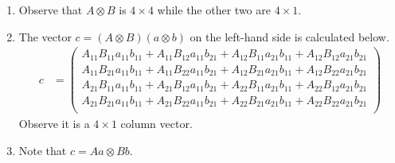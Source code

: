 \begin{answer}
\begin{enumerate}
\begin{align*}
\begin{pmatrix}
				      a_{21} b_{11} \\
				      a_{21} b_{21}
			      \end{pmatrix}
			      \\ Aa \otimes Bb & =
			      \begin{pmatrix}
				      \left( A_{11} a_{11} + A_{12} a_{21} \right)
				      \left( B_{11} b_{11} + B_{12} b_{21} \right) \\
				      \left( A_{11} a_{11} + A_{12} a_{21} \right)
				      \left( B_{21} b_{11} + B_{22} b_{21} \right) \\
				      \left( A_{21} a_{11} + A_{22} a_{21} \right)
				      \left( B_{11} b_{11} + B_{12} b_{21} \right) \\
				      \left( A_{21} a_{11} + A_{22} a_{21} \right)
				      \left( B_{21} b_{11} + B_{22} b_{21} \right)
			      \end{pmatrix}
			                  &
		      \end{align*}
		\item Observe that $A \otimes B$ is $4 \times 4$ while the other two are $4 \times 1$.
		\item
		      The vector $c = \left(A \otimes B\right) \left(a \otimes b\right)$ on the left-hand side is calculated below.
		      \begin{align*}
			      c & =
			      \begin{pmatrix}
				      A_{11} B_{11} a_{11} b_{11} + A_{11} B_{12} a_{11} b_{21} + A_{12} B_{11} a_{21} b_{11} + A_{12} B_{12} a_{21} b_{21} \\
				      A_{11} B_{21} a_{11} b_{11} + A_{11} B_{22} a_{11} b_{21} + A_{12} B_{21} a_{21} b_{11} + A_{12} B_{22} a_{21} b_{21} \\
				      A_{21} B_{11} a_{11} b_{11} + A_{21} B_{12} a_{11} b_{21} + A_{22} B_{11} a_{21} b_{11} + A_{22} B_{12} a_{21} b_{21} \\
				      A_{21} B_{21} a_{11} b_{11} + A_{21} B_{22} a_{11} b_{21} + A_{22} B_{21} a_{21} b_{11} + A_{22} B_{22} a_{21} b_{21} \\
			      \end{pmatrix}
		      \end{align*}
		      Observe it is a $4 \times 1$ column vector.
		\item Note that $c = Aa \otimes Bb$.
	\end{enumerate}
\end{answer}

